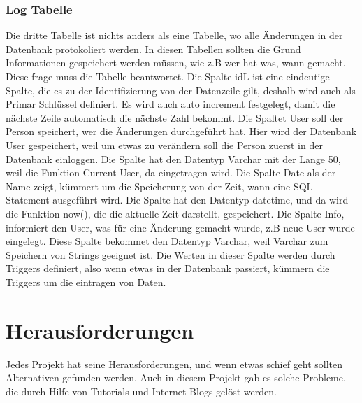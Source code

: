 \subsubsection{Log Tabelle}
Die dritte Tabelle ist nichts anders als eine Tabelle, wo alle Änderungen in der Datenbank protokoliert werden. In diesen Tabellen sollten die Grund Informationen gespeichert werden müssen, wie z.B wer hat was, wann gemacht. Diese frage muss die Tabelle beantwortet.
\bigbreak
Die Spalte idL ist eine eindeutige Spalte, die es zu der Identifizierung von der Datenzeile gilt, deshalb wird auch als Primar Schlüssel definiert. Es wird auch auto increment festgelegt, damit die nächste Zeile automatisch die nächste Zahl bekommt.
\bigbreak
Die Spaltet User soll der Person speichert, wer die Änderungen durchgeführt hat. Hier wird der Datenbank User gespeichert, weil um etwas zu verändern soll die Person zuerst in der Datenbank einloggen. Die Spalte hat den Datentyp Varchar mit der Lange 50, weil die Funktion Current User, da eingetragen wird.
\bigbreak
Die Spalte Date als der Name zeigt, kümmert um die Speicherung von der Zeit, wann eine SQL Statement ausgeführt wird. Die Spalte hat den Datentyp datetime, und da wird die Funktion now(), die die aktuelle Zeit darstellt, gespeichert.
\bigbreak
Die Spalte Info, informiert den User, was für eine Änderung gemacht wurde, z.B neue User wurde eingelegt. Diese Spalte bekommet den Datentyp Varchar, weil Varchar zum Speichern von Strings geeignet ist. Die Werten in dieser Spalte werden durch Triggers definiert, also wenn etwas in der Datenbank passiert, kümmern die Triggers um die eintragen von Daten.
\newpage
\section{Herausforderungen}
Jedes Projekt hat seine Herausforderungen, und wenn etwas schief geht sollten Alternativen gefunden werden. Auch in diesem Projekt gab es solche Probleme, die durch Hilfe von Tutorials und Internet Blogs gelöst werden.
